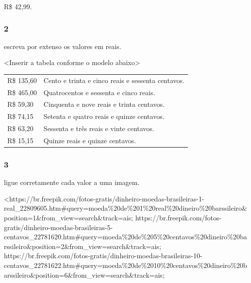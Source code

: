 R\$ 42,99.

\subsubsection{2}\label{section-55}

escreva por extenso os valores em reais.

\textless{}Inserir a tabela conforme o modelo abaixo\textgreater{}

\begin{longtable}[]{@{}ll@{}}
\toprule
R\$ 135,60 & Cento e trinta e cinco reais e sessenta
centavos.\tabularnewline
R\$ 465,00 & Quatrocentos e sessenta e cinco reais.\tabularnewline
R\$ 59,30 & Cinquenta e nove reais e trinta centavos.\tabularnewline
R\$ 74,15 & Setenta e quatro reais e quinze centavos.\tabularnewline
R\$ 63,20 & Sessenta e três reais e vinte centavos.\tabularnewline
R\$ 15,15 & Quinze reais e quinze centavos.\tabularnewline
\bottomrule
\end{longtable}


\subsubsection{3}\label{section-56}

ligue corretamente cada valor a uma imagem.

\textless{}https://br.freepik.com/fotos-gratis/dinheiro-moedas-brasileiras-1-real\_22809605.htm\#query=moeda\%20de\%201\%20real\%20dineiro\%20barssileiro\&position=1\&from\_view=search\&track=ais;
https://br.freepik.com/fotos-gratis/dinheiro-moedas-brasileiras-5-centavos\_22781620.htm\#query=moeda\%20de\%205\%20centavos\%20dineiro\%20barssileiro\&position=2\&from\_view=search\&track=ais;
https://br.freepik.com/fotos-gratis/dinheiro-moedas-brasileiras-10-centavos\_22781622.htm\#query=moeda\%20de\%2010\%20centavos\%20dineiro\%20barssileiro\&position=6\&from\_view=search\&track=ais;

